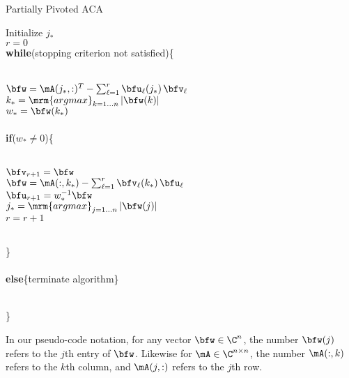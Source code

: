 \begin{algorithm}\label{AlgoACA}
  \caption{Partially Pivoted ACA}
  Initialize $j_{*}$\\
  $r=0$\\
  \textbf{while}(stopping criterion not satisfied)\{\\\quad\\
  \indent\hspace{0.5cm} \parbox{\linewidth}{
    $\bfw = \mA(j_{*},:)^{T} - \sum_{\ell=1}^{r}\bfu_{\ell}(j_{*})\,\bfv_{\ell}$\\
    $k_{*} = \mathop{\mrm{argmax}}_{k = 1\dots n}\vert \bfw(k)\vert$\\
    $w_{*} = \bfw(k_{*})$\\\quad\\
    \textbf{if}($w_{*}\neq 0$)\{\\\quad\\
    \indent\hspace{0.5cm} \parbox{\linewidth}{
      $\bfv_{r+1} = \bfw$\\
      $\bfw = \mA(:,k_{*})-\sum_{\ell = 1}^{r}\bfv_{\ell}(k_{*})\,\bfu_{\ell} $\\
      $\bfu_{r+1} = w_{*}^{-1}\bfw$\\      
      $j_{*} = \mathop{\mrm{argmax}}_{j = 1\dots n} \vert \bfw(j)\vert$\\
      $r=r+1$
    }
    \quad\\
    \}\\\quad\\
    \textbf{else}\{terminate algorithm\}
    }\\
  \}
\end{algorithm}

\bigskip
In our pseudo-code notation, for any vector $\bfw\in \C^{n}$, the number $\bfw(j)$  refers to the $j$th entry of $\bfw$. 
Likewise for $\mA\in \C^{n\times n}$, the number $\mA(:,k)$ refers to the $k$th column, and $\mA(j,:)$ refers to the $j$th
row.

